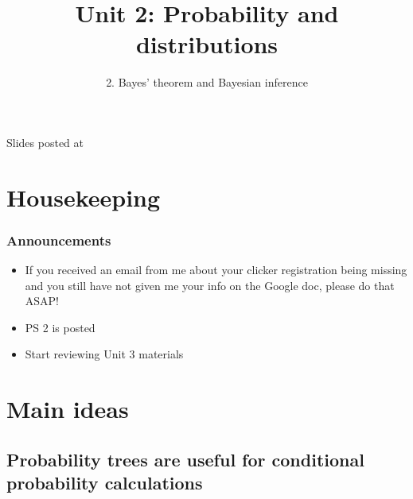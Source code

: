 \documentclass[slidestop,compress,mathserif,12pt,t,professionalfonts,xcolor=table]{beamer}
\title{Unit 2: Probability and distributions}
\subtitle{2. Bayes' theorem and Bayesian inference}
\author{\CourseName}
\date{}
\institute{\InstituteName}
\begin{document}



\begin{frame}[plain]

\titlepage

\vfill

{\scriptsize {} \hfill Slides posted at  \webURL{\CourseSite}}

\addtocounter{framenumber}{-1} 

\end{frame}


\section{Housekeeping}


\begin{frame}
\frametitle{Announcements}

\begin{itemize}

\item If you received an email from me about your clicker registration being
missing and you still have not given me your info on the Google doc, please do that ASAP!

\item PS 2 is posted

\item Start reviewing Unit 3 materials

\end{itemize}

\end{frame}


\section{Main ideas}


\subsection{Probability trees are useful for conditional probability calculations}
\label{mi1}
\end{document}
